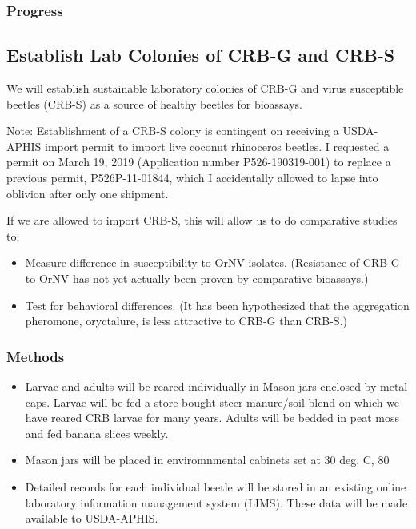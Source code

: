 \documentclass[12pt,letterpaper,english,bibliography=totocnumbered,abstract=on]{scrartcl}
\begin{document}
\subsubsection{Progress}


\subsection{Establish Lab Colonies of CRB-G and CRB-S}

We will establish sustainable laboratory colonies of CRB-G and virus susceptible beetles (CRB-S) as a source of healthy beetles for bioassays.

Note: Establishment of a CRB-S colony is contingent on receiving a USDA-APHIS import permit to import live coconut rhinoceros beetles. I requested a permit on March 19, 2019 (Application number P526-190319-001) to replace a previous permit, P526P-11-01844, which I accidentally allowed to lapse into oblivion after only one shipment.

If we are allowed to import CRB-S, this will allow us to do comparative studies to:

\begin{itemize}
\item Measure difference in susceptibility to OrNV isolates. (Resistance of CRB-G to OrNV has not yet actually been proven by comparative bioassays.)
\item Test for behavioral differences. (It has been hypothesized that the aggregation pheromone, oryctalure, is less attractive to CRB-G than CRB-S.)
\end{itemize}

\subsubsection{Methods}

\begin{itemize}
	\item Larvae and adults will be reared individually in Mason jars enclosed by metal caps. Larvae will be fed a store-bought steer manure/soil blend on which we have reared CRB larvae for many years. Adults will be bedded in peat moss and fed banana slices weekly.
	\item Mason jars will be placed in enviromnmental cabinets set at 30 deg. C, 80%
	\item Detailed records for each individual beetle will be stored in an existing online laboratory information management system (LIMS). These data will be made available to USDA-APHIS.
\end{itemize}
\end{document}
